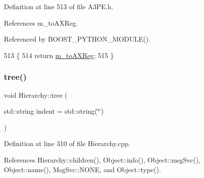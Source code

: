 Definition at line 513 of file A3\+P\+E.\+h.



References m\+\_\+to\+A\+X\+Reg.



Referenced by B\+O\+O\+S\+T\+\_\+\+P\+Y\+T\+H\+O\+N\+\_\+\+M\+O\+D\+U\+L\+E().


\begin{DoxyCode}
513                      \{
514     \textcolor{keywordflow}{return} \hyperlink{classA3PE_abe8eb76e3c0d967403726143deb1b70f}{m\_toAXReg};
515   \}
\end{DoxyCode}
\mbox{\label{classHierarchy_a76e914b9a677a22a82deb74d892bf261}} 
\subsubsection{\texorpdfstring{tree()}{tree()}\hspace{0.1cm}{\footnotesize\ttfamily [1/2]}}
{\footnotesize\ttfamily void Hierarchy\+::tree (\begin{DoxyParamCaption}\item[{std\+::string}]{indent = {\ttfamily std\+:\+:string(\char`\"{}\char`\"{})} }\end{DoxyParamCaption})\hspace{0.3cm}{\ttfamily [inherited]}}



Definition at line 310 of file Hierarchy.\+cpp.



References Hierarchy\+::children(), Object\+::info(), Object\+::msg\+Svc(), Object\+::name(), Msg\+Svc\+::\+N\+O\+NE, and Object\+::type().



